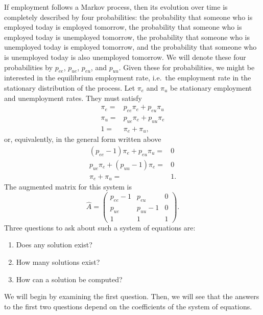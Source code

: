 \documentclass[12pt,reqno]{amsart}
\theoremstyle{definition}
\begin{document}
If employment follows a Markov process, then its evolution over time
is completely described by four probabilities: the probability that
someone who is employed today is employed tomorrow, the probability
that someone who is employed today is unemployed tomorrow, the
probability that someone who is unemployed today is employed tomorrow,
and the probability that someone who is unemployed today is also
unemployed tomorrow. We will denote these four probabilities by
$p_{ee}$, $p_{ue}$, $p_{eu}$, and $p_{uu}$. Given these for
probabilities, we might be interested in the equilibrium employment
rate, i.e.\ the employment rate in the stationary distribution of the
process.  Let $\pi_e$ and $\pi_u$ be stationary employment and
unemployment rates. They must satisfy 
\begin{align*}
  \pi_e =& p_{ee} \pi_e + p_{eu} \pi_u \\
  \pi_u =& p_{ue} \pi_e + p_{uu} \pi_e \\
  1 = & \pi_e + \pi_u,
\end{align*}
or, equivalently, in the general form written above
\begin{align*}
  (p_{ee}-1) \pi_e + p_{eu} \pi_u = & 0\\
  p_{ue} \pi_e + (p_{uu}-1) \pi_e= & 0\\
  \pi_e + \pi_u = & 1 .
\end{align*}
The augmented matrix for this system is
\[ \hat{A} = \begin{pmatrix} p_{ee} - 1 & p_{eu} & 0 \\
  p_{ue} & p_{uu}-1 & 0 \\
  1 & 1 & 1 \end{pmatrix}. \]
Three questions to ask about such a system of equations are:
\begin{enumerate}
\item Does any solution exist? 
\item How many solutions exist?
\item How can a solution be computed?
\end{enumerate}
We will begin by examining the first question.  Then, we will see that
the answers to the first two questions depend on the coefficients of
the system of equations. 
\end{document}
